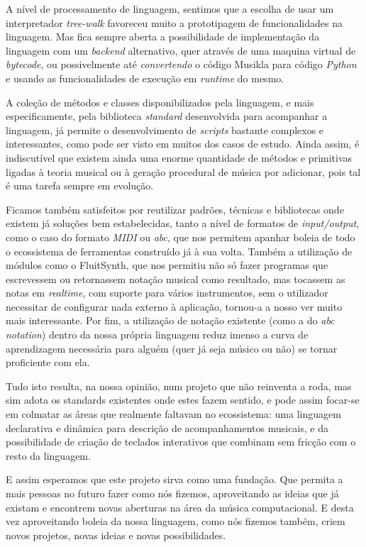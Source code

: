 A nível de processamento de linguagem, sentimos que a escolha de usar um interpretador \textit{tree-walk} favoreceu muito a prototipagem de funcionalidades na linguagem. Mas fica sempre aberta a possibilidade de implementação da linguagem com um \textit{backend} alternativo, quer através de uma maquina virtual de \textit{bytecode}, ou possivelmente até \textit{convertendo} o código Musikla para código \textit{Python} e usando as funcionalidades de execução em \textit{runtime} do mesmo.

A coleção de métodos e classes disponibilizados pela linguagem, e mais especificamente, pela biblioteca \textit{standard} desenvolvida para acompanhar a linguagem, já permite o desenvolvimento de \textit{scripts} bastante complexos e interessantes, como pode ser visto em muitos dos casos de estudo. Ainda assim, é indiscutível que existem ainda uma enorme quantidade de métodos e primitivas ligadas à teoria musical ou à geração procedural de música por adicionar, pois tal é uma tarefa sempre em evolução.

Ficamos também satisfeitos por reutilizar padrões, técnicas e bibliotecas onde existem já soluções bem estabelecidas, tanto a nível de formatos de \textit{input/output}, como o caso do formato \textit{MIDI} ou \textit{abc}, que nos permitem apanhar boleia de todo o ecossistema de ferramentas construído já à sua volta. Também a utilização de módulos como o FluitSynth, que nos permitiu não só fazer programas que escrevessem ou retornassem notação musical como resultado, mas tocassem as notas em \textit{realtime}, com suporte para vários instrumentos, sem o utilizador necessitar de configurar nada externo à aplicação, tornou-a a nosso ver muito mais interessante. Por fim, a utilização de notação existente (como a do \textit{abc notation}) dentro da nossa própria linguagem reduz imenso a curva de aprendizagem necessária para alguém (quer já seja músico ou não) se tornar proficiente com ela.

Tudo isto resulta, na nossa opinião, num projeto que não reinventa a roda, mas sim adota os standards existentes onde estes fazem sentido, e pode assim focar-se em colmatar as áreas que realmente faltavam no ecossistema: uma linguagem declarativa e dinâmica para descrição de acompanhamentos musicais, e da possibilidade de criação de teclados interativos que combinam sem fricção com o resto da linguagem. 

E assim esperamos que este projeto sirva como uma fundação. Que permita a mais pessoas no futuro fazer como nós fizemos, aproveitando as ideias que já existam e encontrem novas aberturas na área da música computacional. E desta vez aproveitando boleia da nossa linguagem, como nós fizemos também, criem novos projetos, novas ideias e novas possibilidades.

